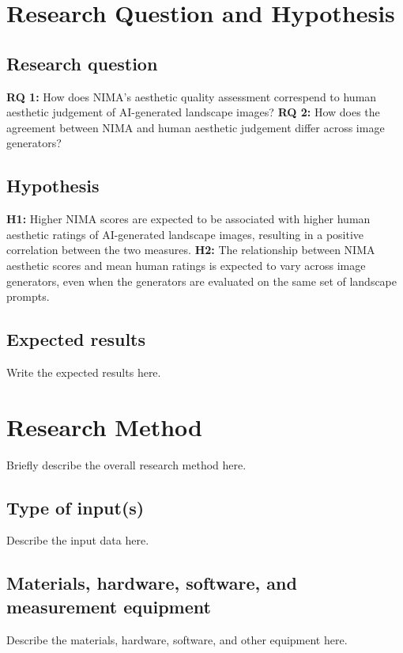 \documentclass[10pt,a4paper]{article}
\begin{document}
\section{Research Question and Hypothesis}

\subsection{Research question}


\textbf{RQ 1:} How does NIMA's aesthetic quality assessment correspend to human aesthetic judgement of AI-generated landscape images?
\smallbreak
\textbf{RQ 2:} How does the agreement between NIMA and human aesthetic judgement differ across image generators?
\subsection{Hypothesis}

\textbf{H1:} Higher NIMA scores are expected to be associated with higher human aesthetic ratings of AI-generated landscape images, resulting in a positive correlation between the two measures.
\smallbreak
\textbf{H2:} The relationship between NIMA aesthetic scores and mean human ratings is expected to vary across image generators, even when the generators are evaluated on the same set of landscape prompts.
\subsection{Expected results}

Write the expected results here.

\section{Research Method}

Briefly describe the overall research method here.

\subsection{Type of input(s)}


Describe the input data here.

\subsection{Materials, hardware, software, and measurement equipment}


Describe the materials, hardware, software, and other equipment here.
\end{document}
